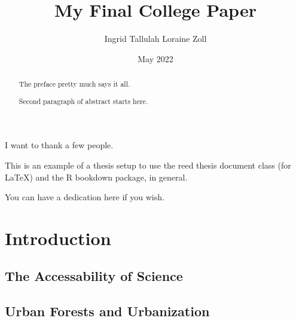 \documentclass[12pt,twoside]{reedthesis}
\title{My Final College Paper}
\author{Ingrid Tallulah Loraine Zoll}
\date{May 2022}
\begin{document}
  \maketitle

\frontmatter %
\pagestyle{empty} %
  \begin{acknowledgements}
    I want to thank a few people.
  \end{acknowledgements}
  \begin{preface}
    This is an example of a thesis setup to use the reed thesis document class
    (for LaTeX) and the R bookdown package, in general.
  \end{preface}
  \hypersetup{linkcolor=black}
  \setcounter{secnumdepth}{2}
  \setcounter{tocdepth}{2}
  \tableofcontents

  \listoftables

  \listoffigures
  \begin{abstract}
    The preface pretty much says it all.

    \par

    Second paragraph of abstract starts here.
  \end{abstract}
  \begin{dedication}
    You can have a dedication here if you wish.
  \end{dedication}
\mainmatter %
\pagestyle{fancyplain} %

\hypertarget{intro}{%
\chapter{Introduction}\label{intro}}

\hypertarget{the-accessability-of-science}{%
\section{The Accessability of Science}\label{the-accessability-of-science}}

\hypertarget{urban-forests-and-urbanization}{%
\section{Urban Forests and Urbanization}\label{urban-forests-and-urbanization}}
\end{document}
